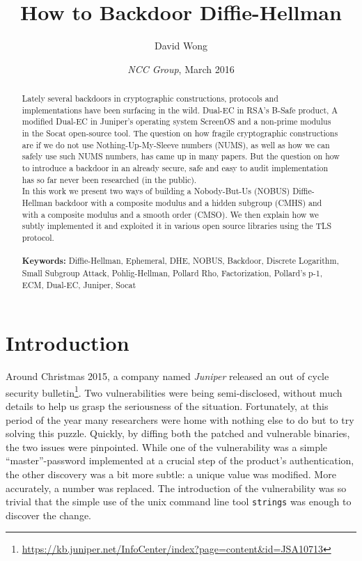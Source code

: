 \documentclass[a4paper,11pt,twocolumn]{article}
\title{How to Backdoor Diffie-Hellman}
\author{David Wong}
\date{\emph{NCC Group}, \small{March 2016}}
\begin{document}
\maketitle
\renewcommand{\abstractname}{Abstract}
\begin{abstract}
Lately several backdoors in cryptographic constructions, protocols and implementations have been surfacing in the wild. Dual-EC in RSA's B-Safe product, A modified Dual-EC in Juniper's operating system ScreenOS and a non-prime modulus in the Socat open-source tool. The question on how fragile cryptographic constructions are if we do not use Nothing-Up-My-Sleeve numbers (NUMS), as well as how we can safely use such NUMS numbers, has came up in many papers. But the question on how to introduce a backdoor in an already secure, safe and easy to audit implementation has so far never been researched (in the public).\\
In this work we present two ways of building a Nobody-But-Us (NOBUS) Diffie-Hellman backdoor with a composite modulus and a hidden subgroup (CMHS) and with a composite modulus and a smooth order (CMSO). We then explain how we subtly implemented it and exploited it in various open source libraries using the TLS protocol.\\
\\
\textbf{Keywords:} Diffie-Hellman, Ephemeral, DHE, NOBUS, Backdoor, Discrete Logarithm, Small Subgroup Attack, Pohlig-Hellman, Pollard Rho, Factorization, Pollard's p-1, ECM, Dual-EC, Juniper, Socat\\

\end{abstract}
\section{Introduction}\label{introduction}

Around Christmas 2015, a company named \emph{Juniper} released an out of cycle security bulletin\footnote{\url{https://kb.juniper.net/InfoCenter/index?page=content&id=JSA10713}}. Two vulnerabilities were being semi-disclosed, without much details to help us grasp the seriousness of the situation. Fortunately, at this period of the year many researchers were home with nothing else to do but to try solving this puzzle. Quickly, by diffing both the patched and vulnerable binaries, the two issues were pinpointed. While one of the vulnerability was a simple ``master''-password implemented at a crucial step of the product's authentication, the other discovery was a bit more subtle: a unique value was modified. More accurately, a number was replaced. The introduction of the vulnerability was so trivial that the simple use of the unix command line tool \texttt{strings} was enough to discover the change.
\end{document}

